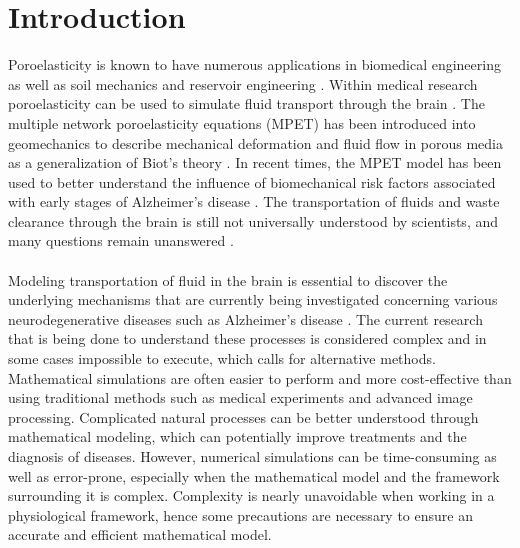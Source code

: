 \chapter{Introduction}
\label{chap:intro}

Poroelasticity is known to have numerous applications in biomedical engineering as well as soil mechanics and reservoir engineering \cite{coussy}. Within medical research poroelasticity can be used to simulate fluid transport through the brain \cite{tully}. The multiple network poroelasticity equations (MPET) has been introduced into geomechanics to describe mechanical deformation and fluid flow in porous media as a generalization of Biot’s theory \cite{biot, biot2}. In recent times, the MPET model has been used to better understand the influence of biomechanical risk factors associated with early stages of Alzheimer's disease \cite{guo}. The transportation of fluids and waste clearance through the brain is still not universally understood by scientists, and many questions remain unanswered \cite{iliff}. 
\\
\\
Modeling transportation of fluid in the brain is essential to discover the underlying mechanisms that are currently being investigated concerning various neurodegenerative diseases such as Alzheimer's disease \cite{bacyinski}. The current research that is being done to understand these processes is considered complex and in some cases impossible to execute, which calls for alternative methods. Mathematical simulations are often easier to perform and more cost-effective than using traditional methods such as medical experiments and advanced image processing. Complicated natural processes can be better understood through mathematical modeling, which can potentially improve treatments and the diagnosis of diseases. However, numerical simulations can be time-consuming as well as error-prone, especially when the mathematical model and the framework surrounding it is complex. Complexity is nearly unavoidable when working in a physiological framework, hence some precautions are necessary to ensure an accurate and efficient mathematical model. 
\\
\\
